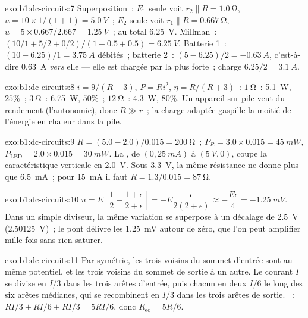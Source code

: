 \begin{solution}{exo:b1:dc-circuits:7}
Superposition~: $E_1$ seule voit $r_2 \parallel R = \qty{1.0}{\ohm}$,
$u = 10 \times 1/(1 + 1) = \qty{5.0}{V}$~; $E_2$ seule voit $r_1 \parallel R
= \qty{0.667}{\ohm}$, $u = 5 \times 0.667/2.667 = \qty{1.25}{V}$~; au total
\qty{6.25}{V}. Millman~: $(10/1 + 5/2 + 0/2)/(1 + 0.5 + 0.5) = \qty{6.25}{V}$.
Batterie 1~: $(10 - 6.25)/1 = \qty{3.75}{A}$ débités~; batterie 2~: $(5 - 6.25)/2
= \qty{-0.63}{A}$, c'est-à-dire \qty{0.63}{A} \emph{vers} elle --- elle
est chargée par la plus forte~; charge $6.25/2 = \qty{3.1}{A}$.
\end{solution}

\begin{solution}{exo:b1:dc-circuits:8}
$i = 9/(R + 3)$, $P = Ri^2$, $\eta = R/(R + 3)$~: $\qty{1}{\ohm}$~:
\qty{5.1}{W}, $25\%$~; $\qty{3}{\ohm}$~: \qty{6.75}{W}, $50\%$~;
$\qty{12}{\ohm}$~: \qty{4.3}{W}, $80\%$. Un appareil sur pile veut du
rendement (l'autonomie), donc $R \gg r$~; la charge adaptée gaspille la
moitié de l'énergie en chaleur dans la pile.
\end{solution}

\begin{solution}{exo:b1:dc-circuits:9}
$R = (5.0 - 2.0)/0.015 = \qty{200}{\ohm}$~; $P_R = 3.0 \times 0.015 =
\qty{45}{mW}$, $P_{\mathrm{LED}} = 2.0 \times 0.015 = \qty{30}{mW}$. La
, de $(0, \qty{25}{mA})$ à $(\qty{5}{V}, 0)$, coupe la
caractéristique verticale en \qty{2.0}{V}. Sous \qty{3.3}{V}, la même
résistance ne donne plus que \qty{6.5}{mA}~; pour \qty{15}{mA} il faut $R = 1.3/0.015 =
\qty{87}{\ohm}$.
\end{solution}

\begin{solution}{exo:b1:dc-circuits:10}
$u = E\left[\dfrac12 - \dfrac{1 + \epsilon}{2 + \epsilon}\right] =
-E\dfrac{\epsilon}{2(2 + \epsilon)} \approx -\dfrac{E\epsilon}{4} =
\qty{-1.25}{mV}$. Dans un simple diviseur, la même variation se
superpose à un décalage de \qty{2.5}{V} (\qty{2.50125}{V})~; le pont
délivre les \qty{1.25}{mV} autour de zéro, que l'on peut amplifier mille
fois sans rien saturer.
\end{solution}

\begin{solution}{exo:b1:dc-circuits:11}
Par symétrie, les trois voisins du sommet d'entrée sont au même
potentiel, et les trois voisins du sommet de sortie à un autre. Le
courant $I$ se divise en $I/3$ dans les trois arêtes d'entrée, puis
chacun en deux $I/6$ le long des six arêtes médianes, qui se
recombinent en $I/3$ dans les trois arêtes de sortie. ~:
$RI/3 + RI/6 + RI/3 = 5RI/6$, donc $R_{\mathrm{eq}} = 5R/6$.
\end{solution}

